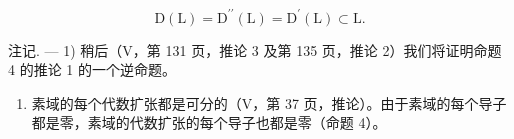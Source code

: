 \[
\mathrm{D} (\mathrm{L}) = \mathrm{D} ^ {\prime \prime} (\mathrm{L}) = \mathrm{D} ^ {\prime} (\mathrm{L}) \subset \mathrm{L}.
\]

注记. --- 1) 稍后（V，第 131 页，推论 3 及第 135 页，推论 2）我们将证明命题 4 的推论 1 的一个逆命题。

\begin{enumerate}
\def\labelenumi{\arabic{enumi})}
\setcounter{enumi}{1}
\tightlist
\item
  素域的每个代数扩张都是可分的（V，第 37 页，推论）。由于素域的每个导子都是零，素域的代数扩张的每个导子也都是零（命题 4）。
\end{enumerate}

